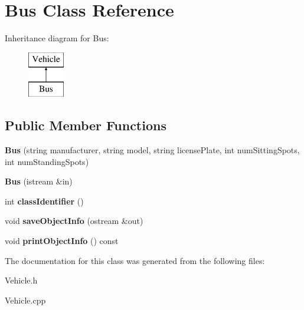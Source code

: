 \hypertarget{class_bus}{}\section{Bus Class Reference}
\label{class_bus}
Inheritance diagram for Bus\+:\begin{figure}[H]
\begin{center}
\leavevmode
\includegraphics[height=2.000000cm]{class_bus}
\end{center}
\end{figure}
\subsection*{Public Member Functions}
\begin{DoxyCompactItemize}
\item 
\hypertarget{class_bus_adfb5b76cdad7c915cebf59b1670091ff}{}{\bfseries Bus} (string manufacturer, string model, string license\+Plate, int num\+Sitting\+Spots, int num\+Standing\+Spots)\label{class_bus_adfb5b76cdad7c915cebf59b1670091ff}

\item 
\hypertarget{class_bus_a272be09e059cd47be6793eaa4e853e0d}{}{\bfseries Bus} (istream \&in)\label{class_bus_a272be09e059cd47be6793eaa4e853e0d}

\item 
\hypertarget{class_bus_adc766f7d78116640cc5aeb52e22ae143}{}int {\bfseries class\+Identifier} ()\label{class_bus_adc766f7d78116640cc5aeb52e22ae143}

\item 
\hypertarget{class_bus_adf58347d7a8ae2a05548f5d5eef8b5dd}{}void {\bfseries save\+Object\+Info} (ostream \&out)\label{class_bus_adf58347d7a8ae2a05548f5d5eef8b5dd}

\item 
\hypertarget{class_bus_a5713a725a5c73412c2686d6bba61c9a4}{}void {\bfseries print\+Object\+Info} () const \label{class_bus_a5713a725a5c73412c2686d6bba61c9a4}

\end{DoxyCompactItemize}


The documentation for this class was generated from the following files\+:\begin{DoxyCompactItemize}
\item 
Vehicle.\+h\item 
Vehicle.\+cpp\end{DoxyCompactItemize}
